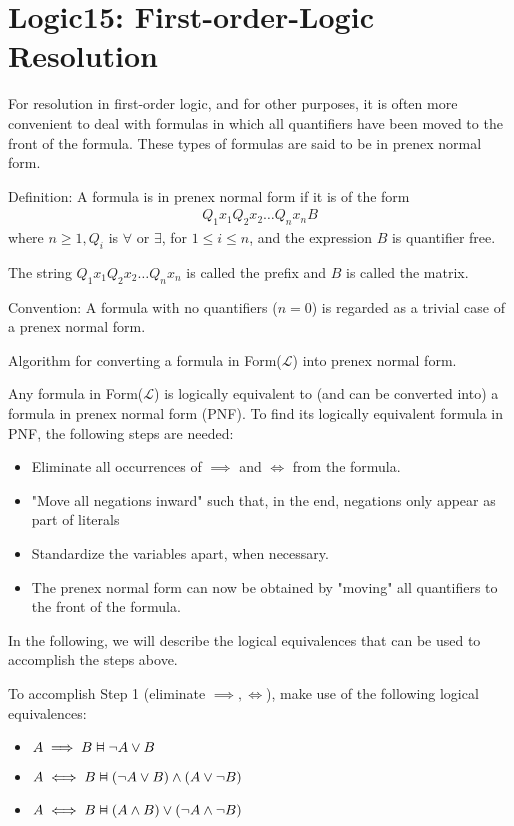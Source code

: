 \documentclass{article}
\newcommand{\vDashv}{%
  \mathrel{%
    \text{%
      \ooalign{$\vDash$\cr\reflectbox{$\vDash$}\cr}%
    }%
  }%
}
\begin{document}
\section{Logic15: First-order-Logic Resolution}

For resolution in first-order logic, and for other purposes, it is often more convenient to deal with formulas in which all quantifiers have been moved to the front of the formula. These types of formulas are said to be in prenex normal form.

Definition: A formula is in prenex normal form if it is of the form
\begin{align*}
Q_1x_1 Q_2x_2 \ldots Q_nx_n B
\end{align*}
where $n \ge 1, Q_i$ is $\forall$ or $\exists$, for $1 \le i \le n$, and the expression $B$ is quantifier free.

The string $Q_1x_1 Q_2x_2 \ldots Q_n x_n$ is called the prefix and $B$ is called the matrix.

Convention: A formula with no quantifiers ($n = 0$) is regarded as a trivial case of a prenex normal form.

Algorithm for converting a formula in Form($\mathcal{L}$) into prenex normal form.

Any formula in Form($\mathcal{L}$) is logically equivalent to (and can be converted into) a formula in prenex normal form (PNF). To find its logically equivalent formula in PNF, the following steps are needed:
\begin{itemize}
    \item Eliminate all occurrences of $\implies$ and $\iff$ from the formula.
    \item "Move all negations inward" such that, in the end, negations only appear as part of literals
    \item Standardize the variables apart, when necessary.
    \item The prenex normal form can now be obtained by "moving" all quantifiers to the front of the formula.
\end{itemize}

In the following, we will describe the logical equivalences that can be used to accomplish the steps above.

To accomplish Step 1 (eliminate $\implies, \iff$), make use of the following logical equivalences:
\begin{itemize}
    \item $A \implies B \vDashv \neg A \vee B$ 
    \item $A \iff B \vDashv (\neg A \vee B) \wedge (A \vee \neg B)$
    \item $A \iff B \vDashv (A \wedge B) \vee (\neg A \wedge \neg B)$
\end{itemize}
\end{document}
